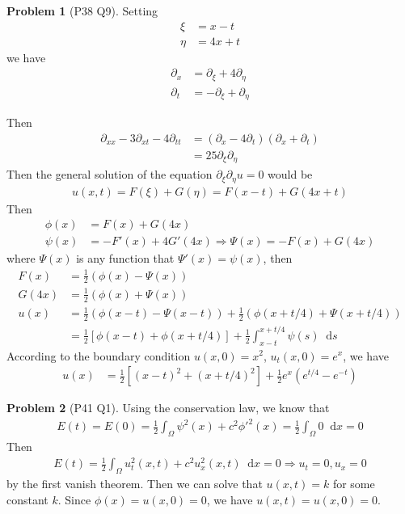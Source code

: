 \documentclass[twoside,11pt]{article}
\renewcommand*\d{\mathop{}\!\mathrm{d}}
\theoremstyle{definition}
\newtheorem{problem}{Problem}
\theoremstyle{remark}
\begin{document}
\begin{problem}[P38 Q9]
Setting 
\begin{align*}
    \xi &= x-t\\
    \eta &= 4x+t
\end{align*}
we have
\begin{align*}
    \partial_x &= \partial_\xi + 4\partial_\eta\\
    \partial_t &= -\partial_\xi + \partial_\eta
\end{align*}
\end{problem}
Then 
\begin{align*}
    \partial_{xx} - 3\partial_{xt} - 4\partial_{tt} &=
    (\partial_x - 4\partial_t)(\partial_x+\partial_t)\\
    &= 25 \partial_\xi \partial_\eta
\end{align*}
Then the general solution of the equation $\partial_\xi\partial_\eta u = 0$ would be
\begin{align*}
    u(x, t) = F(\xi) + G(\eta) = F(x-t) + G(4x+t)
\end{align*}
Then
\begin{align*}
    \phi(x) &= F(x) + G(4x)\\
    \psi(x) &= -F'(x) + 4G'(4x)\Rightarrow \Psi(x) = -F(x) + G(4x)
\end{align*}
where $\Psi(x)$ is any function that $\Psi'(x)=\psi(x)$, then
\begin{align*}
    F(x) &= \frac{1}{2}(\phi(x) - \Psi(x))\\
    G(4x) &= \frac{1}{2}(\phi(x) + \Psi(x))\\
    u(x) &= \frac{1}{2}(\phi(x-t) - \Psi(x-t)) + \frac{1}{2}(\phi(x+t/4)+\Psi(x+t/4))\\
    &= \frac{1}{2}[\phi(x-t)+\phi(x+t/4)] + \frac{1}{2}\int_{x-t}^{x+t/4}\psi(s)\d s
\end{align*}
According to the boundary condition $u(x, 0)=x^2$, $u_t(x, 0)=e^x$, we have
\begin{align*}
    u(x) &= \frac{1}{2}[(x-t)^2+(x+t/4)^2] + \frac{1}{2}e^x(e^{t/4}-e^{-t})
\end{align*}

\begin{problem}[P41 Q1]
    Using the conservation law, we know that
    \begin{align*}
        E(t) = E(0) = \frac{1}{2}\int_\Omega \psi^2(x) + c^2{\phi'}^2(x) 
        = \frac{1}{2}\int_\Omega 0\d x = 0
    \end{align*}
    Then
    \begin{align*}
        E(t) = \frac{1}{2}\int_\Omega u_t^2(x, t) + c^2u_x^2(x,t) \d x = 0
        \Rightarrow u_t = 0, u_x = 0
    \end{align*}
    by the first vanish theorem.
    Then we can solve that $u(x,t)=k$ for some constant $k$.
    Since $\phi(x)=u(x,0)=0$, we have $u(x,t)=u(x,0)=0$.
\end{problem}
\end{document}
